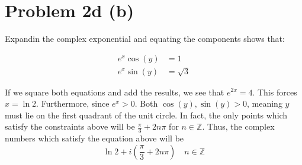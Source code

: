 \documentclass[12pt]{article}%
\begin{document}
\section*{Problem 2d (b)}

Expandin the complex exponential and equating the components shows that:

\begin{align*}
  e^x\cos(y) & = 1 \\
  e^x\sin(y) & = \sqrt{3}
\end{align*}

If we square both equations and add the results, we see that $e^{2x} = 4$. This forces $x = \ln{2}$. Furthermore, since $e^x > 0$. Both $\cos(y), \sin(y) > 0$, meaning $y$ must lie on the first quadrant of the unit circle. In fact, the only points which satisfy the constraints above will be $\frac{\pi}{3} + 2n\pi$ for $n \in \mathbb{Z}$. Thus, the complex numbers which satisfy the equation above will be \[ \ln{2} + i\left(\frac{\pi}{3} + 2n\pi \right) \quad n \in \mathbb{Z} \]
\end{document}
